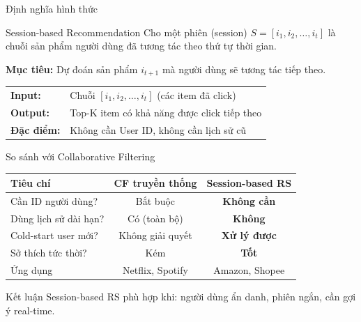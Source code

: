 \documentclass[aspectratio=169, 11pt]{beamer}
\begin{document}
\begin{frame}{Định nghĩa hình thức}
\begin{block}{Session-based Recommendation}
Cho một phiên (session) $S = [i_1, i_2, \ldots, i_t]$ là chuỗi sản phẩm người dùng đã tương tác theo thứ tự thời gian.

\vspace{0.3cm}
\textbf{Mục tiêu:} Dự đoán sản phẩm $i_{t+1}$ mà người dùng sẽ tương tác tiếp theo.
\end{block}

\vspace{0.5cm}
\begin{center}
\begin{tabular}{ll}
\textbf{Input:} & Chuỗi $[i_1, i_2, \ldots, i_t]$ (các item đã click) \\
\textbf{Output:} & Top-K item có khả năng được click tiếp theo \\
\textbf{Đặc điểm:} & Không cần User ID, không cần lịch sử cũ \\
\end{tabular}
\end{center}
\end{frame}

\begin{frame}{So sánh với Collaborative Filtering}
\begin{table}
\centering
\begin{tabular}{lcc}
\toprule
\textbf{Tiêu chí} & \textbf{CF truyền thống} & \textbf{Session-based RS} \\
\midrule
Cần ID người dùng? & Bắt buộc & \textcolor{green!60!black}{\textbf{Không cần}} \\
Dùng lịch sử dài hạn? & Có (toàn bộ) & \textcolor{green!60!black}{\textbf{Không}} \\
Cold-start user mới? & Không giải quyết & \textcolor{green!60!black}{\textbf{Xử lý được}} \\
Sở thích tức thời? & Kém & \textcolor{green!60!black}{\textbf{Tốt}} \\
\midrule
Ứng dụng & Netflix, Spotify & Amazon, Shopee \\
\bottomrule
\end{tabular}
\end{table}

\vspace{0.3cm}
\begin{alertblock}{Kết luận}
Session-based RS phù hợp khi: người dùng ẩn danh, phiên ngắn, cần gợi ý real-time.
\end{alertblock}
\end{frame}
\end{document}
